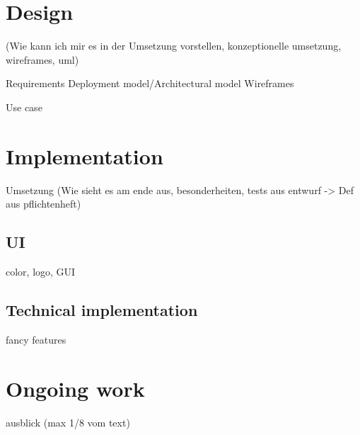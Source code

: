 \chapter{Design}
(Wie kann ich mir es in der Umsetzung vorstellen, konzeptionelle umsetzung, wireframes, uml)

Requirements
Deployment model/Architectural model
Wireframes

Use case

\label{sec:Wireframes}

\chapter{Implementation}
Umsetzung (Wie sieht es am ende aus, besonderheiten, tests aus entwurf -> Def aus pflichtenheft)

\section{UI}
color, logo, GUI

\label{sec:GUI}

\section{Technical implementation}

fancy features

\chapter{Ongoing work}
\label{chapter:OngoingWork}
ausblick (max 1/8 vom text)

